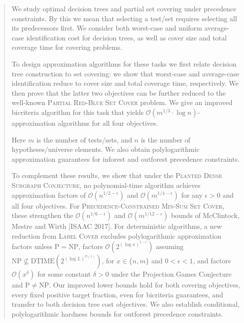\begin{abstract}
\normalsize
\setlength{\emergencystretch}{1em}
We study optimal decision trees and partial set covering under precedence constraints. By this we mean that selecting a test/set requires selecting all its predecessors first. We consider both worst-case and uniform average-case identification cost for decision trees, as well as cover size and total coverage time for covering problems.

To design approximation algorithms for these tasks we first relate decision tree construction to set covering: we show that worst-case and average-case identification reduce to cover size and total coverage time, respectively. We then prove that the latter two objectives can be further reduced to the well-known \textup{\textsc{Partial Red-Blue Set Cover}} problem. We give an improved bicriteria algorithm for this task that yields $\mathcal{O}\left(m^{1/3}\cdot\log n\right)$-approximation algorithms for all four objectives.

Here $m$ is the number of tests/sets, and $n$ is the number of hypotheses/universe elements. We also obtain polylogarithmic approximation guarantees for inforest and outforest precedence constraints.

To complement these results, we show that under the \textsc{Planted Dense Subgraph Conjecture}, no polynomial-time algorithm achieves approximation factors of $\mathcal{O}(n^{1/2-\epsilon})$ and $\mathcal{O}(m^{1/4-\epsilon})$ for any $\epsilon>0$ and all four objectives. For \textsc{Precedence-Constrained Min-Sum Set Cover}, these strengthen the $\mathcal{O}(n^{1/6-\epsilon})$ and $\mathcal{O}(m^{1/12-\epsilon})$ bounds of McClintock, Mestre and Wirth [ISAAC 2017]. For deterministic algorithms, a new reduction from \textup{\textsc{Label Cover}} excludes polylogarithmic approximation factors unless $\mathrm{P}=\mathrm{NP}$, factors $\mathcal{O}(2^{(\log x)^{1-\epsilon}})$ assuming $\mathrm{NP}\not\subseteq \mathrm{DTIME}\left(2^{(\log L)^{O(1)}}\right)$, for $x\in\{n,m\}$ and $0<\epsilon<1$, and factors $\mathcal{O}(x^\delta)$ for some constant $\delta>0$ under the Projection Games Conjecture and $\mathrm{P}\ne\mathrm{NP}$. Our improved lower bounds hold for both covering objectives, every fixed positive target fraction, even for bicriteria guarantees, and transfer to both decision tree cost objectives. We also establish conditional, polylogarithmic hardness bounds for outforest precedence constraints. 
\end{abstract}
